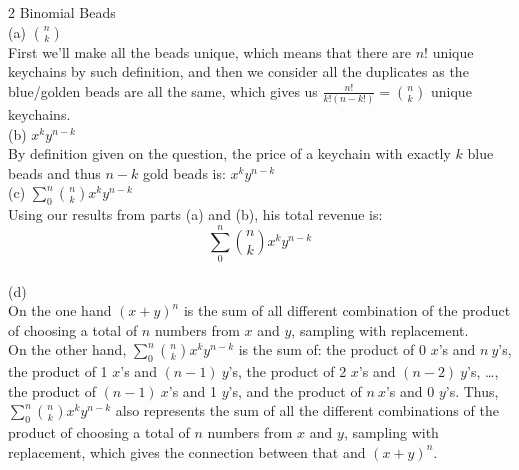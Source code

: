 \documentclass{article}
\begin{document}
{\Large 2 Binomial Beads} \\[.5cm]
{\color{red} (a) $\binom{n}{k}$} \\

First we'll make all the beads unique, which means that there are $n!$ unique keychains by such definition, and then we consider all the duplicates as the blue/golden beads are all the same, which gives us $\frac{n!}{k!(n-k!)} = \binom{n}{k}$ unique keychains. \\[.5cm]
{\color{red} (b) $x^ky^{n-k}$} \\

By definition given on the question, the price of a keychain with exactly $k$ blue beads and thus $n-k$ gold beads is: $x^ky^{n-k}$ \\[.5cm]
{\color{red} (c) $\sum\limits_{0}^n \binom{n}{k} x^ky^{n-k}$} \\

Using our results from parts (a) and (b), his total revenue is: 
$$\sum\limits_{0}^n \binom{n}{k} x^ky^{n-k}$$ \\[.5cm]
{\color{red} (d)} \\

On the one hand $(x+y)^n$ is the sum of all different combination of the product of choosing a total of $n$ numbers from $x$ and $y$, sampling with replacement. \\

On the other hand, $\sum\limits_{0}^n \binom{n}{k} x^ky^{n-k}$ is the sum of: the product of 0 $x$'s and $n\ y$'s, the product of 1 $x$'s and $(n-1)\ y$'s, the product of 2 $x$'s and $(n-2)\ y$'s, \dots, the product of $(n-1)\ x$'s and 1 $y$'s, and the product of $n\ x$'s and 0 $y$'s. Thus, $\sum\limits_{0}^n \binom{n}{k} x^ky^{n-k}$ also represents the sum of all the different combinations of the product of choosing a total of $n$ numbers from $x$ and $y$, sampling with replacement, which gives the connection between that and $(x+y)^n$.
\end{document}

